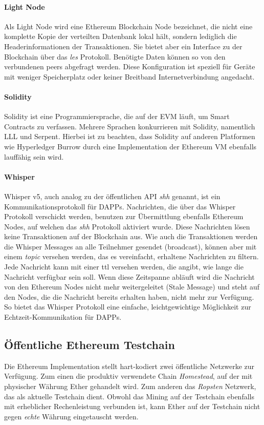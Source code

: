 \paragraph{Light Node}
\label{para:Light_Node}

Als Light Node wird eine Ethereum Blockchain Node bezeichnet, die nicht eine komplette Kopie der verteilten Datenbank lokal hält, sondern lediglich die Headerinformationen der Transaktionen. Sie bietet aber ein Interface zu der Blockchain über das \emph{les} Protokoll. Benötigte Daten können so von den verbundenen peers abgefragt werden. Diese Konfiguration ist speziell für Geräte mit weniger Speicherplatz oder keiner Breitband Internetverbindung angedacht.\cite[]{go-ethereum}
\paragraph{Solidity}
Solidity ist eine Programmiersprache, die auf der \acrfull{EVM} läuft, um Smart Contracts zu verfassen. Mehrere Sprachen konkurrieren mit Solidity, namentlich LLL und Serpent. Hierbei ist zu beachten, dass Solidity auf anderen Platformen wie Hyperledger Burrow durch eine Implementation der Ethereum VM ebenfalls lauffähig sein wird.\cite{github.com/hyperledger/burrow}

\paragraph{Whisper}
\label{para:Whisper}
Whisper v5, auch analog zu der öffentlichen API \emph{shh} genannt, ist ein Kommunikationsprotokoll für \acrfull{DAPPs}. Nachrichten, die über das Whisper Protokoll verschickt werden, benutzen zur Übermittlung ebenfalls Ethereum Nodes, auf welchen das \emph{shh} Protokoll aktiviert wurde. Diese Nachrichten lösen keine Transaktionen auf der Blockchain aus. Wie auch die Transaktionen werden die Whisper Messages an alle Teilnehmer gesendet (broadcast), können aber mit einem \emph{topic} versehen werden, das es vereinfacht, erhaltene Nachrichten zu filtern. Jede Nachricht kann mit einer \acrfull{ttl} versehen werden, die angibt, wie lange die Nachricht verfügbar sein soll. Wenn diese Zeitspanne abläuft wird die Nachricht von den Ethereum Nodes nicht mehr weitergeleitet (Stale Message) und steht auf den Nodes, die die Nachricht bereits erhalten haben, nicht mehr zur Verfügung. So bietet das Whisper Protokoll eine einfache, leichtgewichtige Möglichkeit zur Echtzeit-Kommunikation für \acrshort{DAPPs}.

\subsection{Öffentliche Ethereum Testchain}
\label{subsec:oeffentliche_testchain}
Die Ethereum Implementation stellt hart-kodiert zwei öffentliche Netzwerke zur Verfügung. Zum einen die produktiv verwendete Chain \emph{Homestead}, auf der mit physischer Währung Ether gehandelt wird\cite[{Ether}]{ethereum-homestead.readthedocs.io}. Zum anderen das \emph{Ropsten} Netzwerk, das als aktuelle Testchain dient. Obwohl das Mining auf der Testchain ebenfalls mit erheblicher Rechenleistung verbunden ist, kann Ether auf der Testchain nicht gegen \emph{echte} Währung eingetauscht werden.

